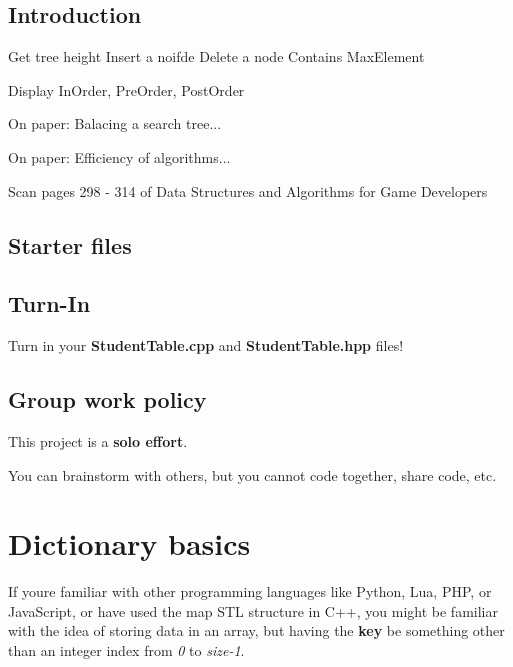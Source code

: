 \subsection*{Introduction}

Get tree height Insert a noifde Delete a node Contains Max\+Element

Display In\+Order, Pre\+Order, Post\+Order

On paper\+: Balacing a search tree...

On paper\+: Efficiency of algorithms...

Scan pages 298 -\/ 314 of Data Structures and Algorithms for Game Developers

\subsection*{Starter files}

\subsection*{Turn-\/\+In}


\begin{DoxyItemize}
\item Turn in your {\bfseries Student\+Table.\+cpp} and {\bfseries Student\+Table.\+hpp} files!
\end{DoxyItemize}

\subsection*{Group work policy}


\begin{DoxyItemize}
\item This project is a {\bfseries solo effort}.
\item You can brainstorm with others, but you cannot code together, share code, etc. 


\end{DoxyItemize}

\section*{Dictionary basics}

If you\textquotesingle{}re familiar with other programming languages like Python, Lua, P\+HP, or Java\+Script, or have used the map S\+TL structure in C++, you might be familiar with the idea of storing data in an array, but having the {\bfseries key} be something other than an integer index from {\itshape 0} to {\itshape size-\/1}.

